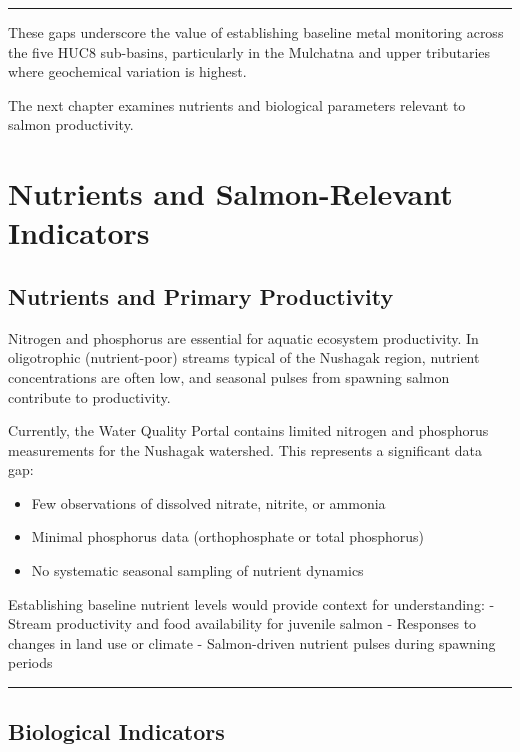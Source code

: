 \documentclass[
  letterpaper,
]{scrbook}
\providecommand{\tightlist}{%
  \setlength{\itemsep}{0pt}\setlength{\parskip}{0pt}}\usepackage{longtable,booktabs,array}
\begin{document}
\begin{center}\rule{0.5\linewidth}{0.5pt}\end{center}

These gaps underscore the value of establishing baseline metal
monitoring across the five HUC8 sub-basins, particularly in the
Mulchatna and upper tributaries where geochemical variation is highest.

The next chapter examines nutrients and biological parameters relevant
to salmon productivity.

\chapter{Nutrients and Salmon-Relevant
Indicators}\label{nutrients-and-salmon-relevant-indicators}

\section{Nutrients and Primary
Productivity}\label{nutrients-and-primary-productivity}

Nitrogen and phosphorus are essential for aquatic ecosystem
productivity. In oligotrophic (nutrient-poor) streams typical of the
Nushagak region, nutrient concentrations are often low, and seasonal
pulses from spawning salmon contribute to productivity.

Currently, the Water Quality Portal contains limited nitrogen and
phosphorus measurements for the Nushagak watershed. This represents a
significant data gap:

\begin{itemize}
\tightlist
\item
  Few observations of dissolved nitrate, nitrite, or ammonia
\item
  Minimal phosphorus data (orthophosphate or total phosphorus)
\item
  No systematic seasonal sampling of nutrient dynamics
\end{itemize}

Establishing baseline nutrient levels would provide context for
understanding: - Stream productivity and food availability for juvenile
salmon - Responses to changes in land use or climate - Salmon-driven
nutrient pulses during spawning periods

\begin{center}\rule{0.5\linewidth}{0.5pt}\end{center}

\section{Biological Indicators}\label{biological-indicators}
\end{document}
